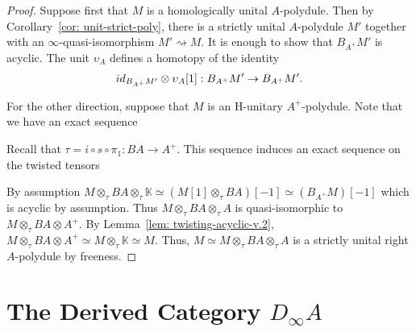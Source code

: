 \documentclass[../thesis.tex]{subfiles}
\begin{document}
            \begin{proof}
                Suppose first that $M$ is a homologically unital $A$-polydule. Then by Corollary~\ref{cor: unit-strict-poly}, there is a strictly unital $A$-polydule $M'$ together with an $\infty$-quasi-isomorphism $M' \rightsquigarrow M$. It is enough to show that $B_{A^+}M'$ is acyclic. The unit $\upsilon_{A}$ defines a homotopy of the identity
                \begin{align*}
                    id_{B_{A^+}M'}\otimes \upsilon_{A}[1] : B_{A^+}M' \rightarrow B_{A^+}M'\tt{.}
                \end{align*}

                For the other direction, suppose that $M$ is an H-unitary $A^+$-polydule. Note that we have an exact sequence
                \begin{center}
                \end{center}
                Recall that $\tau = i\circ s \circ \pi_1 : BA \rightarrow A^+$. This sequence induces an exact sequence on the twisted tensors
                \begin{center}
                \end{center}
                By assumption $M \otimes_\tau BA \otimes_\tau \mathbb{K} \simeq (M[1] \otimes_\tau BA)[-1] \simeq (B_{A^+}M)[-1]$ which is acyclic by assumption. Thus $M \otimes_\tau BA \otimes_\tau A$ is quasi-isomorphic to $M \otimes_\tau BA \otimes A^+$. By Lemma~\ref{lem: twisting-acyclic-v.2}, $M \otimes_\tau BA \otimes A^+ \simeq M \otimes _\tau \mathbb{K} \simeq M$. Thus, $M \simeq M\otimes_\tau BA \otimes_\tau A$ is a strictly unital right $A$-polydule by freeness. 
            \end{proof}

    \section{The Derived Category $D_\infty A$}
\end{document}
